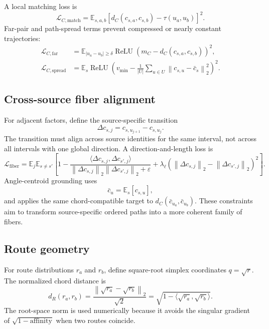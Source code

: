 \documentclass[11pt,a4paper]{article}
\newcommand{\E}{\mathbb{E}}
\newcommand{\loss}{\mathcal{L}}
\newcommand{\norm}[1]{\left\lVert #1 \right\rVert}
\newcommand{\relu}{\operatorname{ReLU}}
\begin{document}
A local matching loss is
\begin{equation}
 \loss_{C,\mathrm{match}}
 =\E_{s,a,b}
 \left[d_C(c_{s,a},c_{s,b})-\tau(u_a,u_b)\right]^2.
\end{equation}
Far-pair and path-spread terms prevent compressed or nearly constant trajectories:
\begin{align}
 \loss_{C,\mathrm{far}}
 &=\E_{|u_a-u_b|\geq\delta}
 \relu\left(m_C-d_C(c_{s,a},c_{s,b})\right)^2,\\
 \loss_{C,\mathrm{spread}}
 &=\E_s\relu\left(v_{\min}-\frac1{|U|}\sum_{u\in U}
 \norm{c_{s,u}-\bar c_s}_2^2\right)^2.
\end{align}

\subsection{Cross-source fiber alignment}

For adjacent factors, define the source-specific transition
\begin{equation}
 \Delta c_{s,j}=c_{s,u_{j+1}}-c_{s,u_j}.
\end{equation}
The transition must align across source identities for the same interval, not across all intervals with one global direction. A direction-and-length loss is
\begin{equation}
 \loss_{\mathrm{fiber}}=
 \E_j\E_{s\neq s'}
 \left[
 1-\frac{\langle\Delta c_{s,j},\Delta c_{s',j}\rangle}
 {\norm{\Delta c_{s,j}}_2\norm{\Delta c_{s',j}}_2+\varepsilon}
 +\lambda_{\ell}
 \left(\norm{\Delta c_{s,j}}_2-\norm{\Delta c_{s',j}}_2\right)^2
 \right].
\end{equation}
Angle-centroid grounding uses
\begin{equation}
 \bar c_u=\E_s[c_{s,u}],
\end{equation}
and applies the same chord-compatible target to $d_C(\bar c_{u_a},\bar c_{u_b})$. These constraints aim to transform source-specific ordered paths into a more coherent family of fibers.

\subsection{Route geometry}

For route distributions $r_a$ and $r_b$, define square-root simplex coordinates $q=\sqrt r$. The normalized chord distance is
\begin{equation}
 d_R(r_a,r_b)=\frac{\norm{\sqrt{r_a}-\sqrt{r_b}}_2}{\sqrt2}
 =\sqrt{1-\langle\sqrt{r_a},\sqrt{r_b}\rangle}.
\end{equation}
The root-space norm is used numerically because it avoids the singular gradient of $\sqrt{1-\mathrm{affinity}}$ when two routes coincide.
\end{document}
